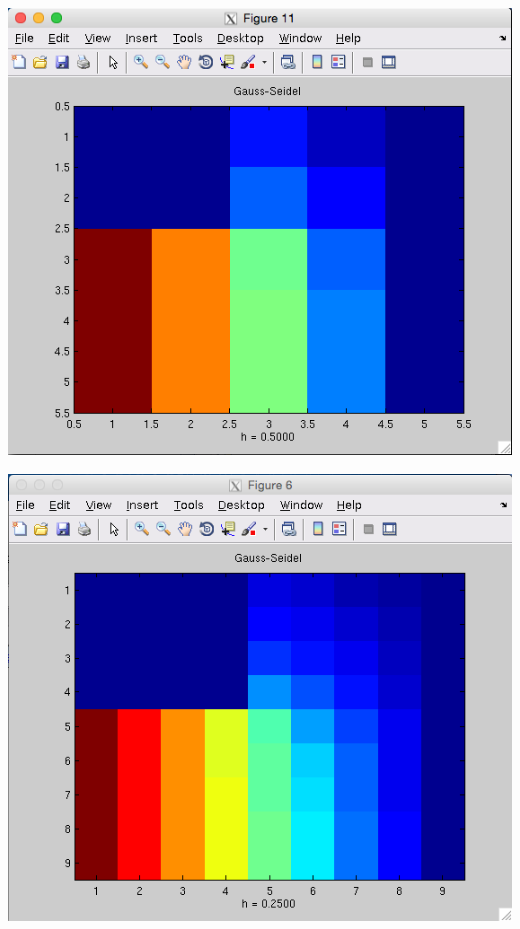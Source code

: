 \documentclass[11pt, oneside]{article}   	%
\begin{document}
\centerline{\includegraphics[scale = 0.55]{Gauss_h1.png}}

\centerline{\includegraphics[scale = 0.55]{Gauss_h2.png}}
\end{document}
